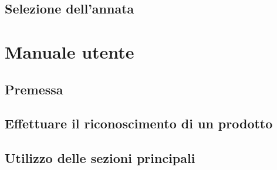 \subsection{Selezione dell'annata}

\section{Manuale utente}
\subsection{Premessa}
\subsection{Effettuare il riconoscimento di un prodotto}
\subsection{Utilizzo delle sezioni principali}